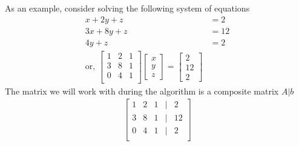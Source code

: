 \documentclass[../../linear_algebra.tex]{subfiles}
\begin{document}
As an example, consider solving the following system of equations
\begin{align*}
    x + 2y + z &= 2\\
    3x + 8y + z &= 12\\
    4y + z &= 2\\
    \text{or, } \begin{bmatrix}
    1 &2 &1\\
    3 &8 &1\\
    0 &4 &1\\
    \end{bmatrix}
    \begin{bmatrix}
        x\\y\\z
    \end{bmatrix} = \begin{bmatrix}
        2\\12\\2
    \end{bmatrix}
\end{align*}
The matrix we will work with during the algorithm is a composite matrix $A \lvert b$
\begin{align*}
    \begin{bmatrix}
    1 &2 &1 &\lvert &2\\
    3 &8 &1 &\lvert &12\\
    0 &4 &1 &\lvert &2\\
    \end{bmatrix}
\end{align*}
\end{document}
